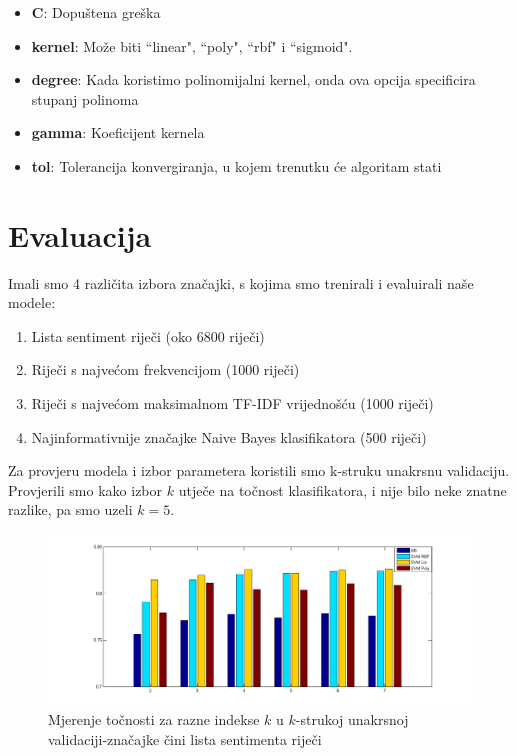 \documentclass[conference]{IEEEtran}
\begin{document}
\begin{itemize}
  \item{\textbf{C}:} Dopuštena greška
  \item{\textbf{kernel}:} Može biti ``linear", ``poly", ``rbf" i ``sigmoid".
  \item{\textbf{degree}:} Kada koristimo polinomijalni kernel, onda ova opcija
    specificira stupanj polinoma
  \item{\textbf{gamma}:} Koeficijent kernela
  \item{\textbf{tol}:} Tolerancija konvergiranja, u kojem trenutku će algoritam
    stati
\end{itemize}

\section{Evaluacija}

Imali smo 4 različita izbora značajki, s kojima smo trenirali i evaluirali
naše modele:

\begin{enumerate}
  \item Lista sentiment riječi (oko 6800 riječi)
  \item Riječi s najvećom frekvencijom (1000 riječi)
  \item Riječi s najvećom maksimalnom TF-IDF vrijednošću (1000 riječi)
  \item Najinformativnije značajke Naive Bayes klasifikatora (500 riječi)
\end{enumerate}

Za provjeru modela i izbor parametera koristili smo k-struku unakrsnu
validaciju. Provjerili smo kako izbor $k$ utječe na točnost klasifikatora,
i nije bilo neke znatne razlike, pa smo uzeli $k = 5$.

\begin{figure}[H]
\begin{minipage}{0.5\textwidth}
\centering
\includegraphics[width=\textwidth]{images/testK-fold.png}
\caption{Mjerenje točnosti za razne indekse $k$ u $k$-strukoj unakrsnoj validaciji-značajke čini lista sentimenta riječi}
\end{minipage}
\end{figure}
\end{document}
